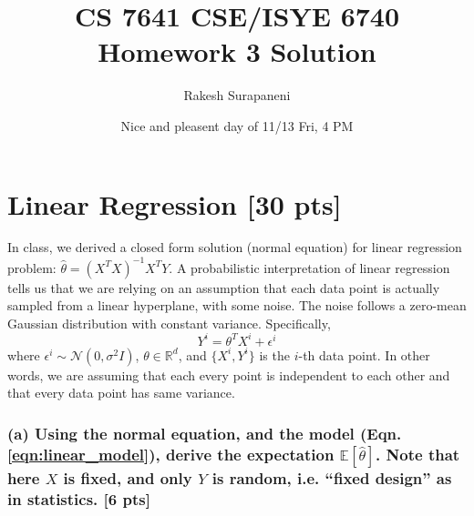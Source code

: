 \documentclass[twoside,10pt]{article}
\begin{document}
\title{CS 7641 CSE/ISYE 6740 Homework 3 Solution}
\author{Rakesh Surapaneni}
\date{ Nice and pleasent day of 11/13 Fri, 4 PM}
\maketitle

\section{Linear Regression [30 pts]}

In class, we derived a closed form solution (normal equation) for
linear regression problem: $\hat{\theta} = (X^T X)^{-1} X^T Y$. A
probabilistic interpretation of linear regression tells us that we
are relying on an assumption that each data point is actually
sampled from a linear hyperplane, with some noise. The noise
follows a zero-mean Gaussian distribution with constant variance.
Specifically,
\begin{equation}
Y^i = \theta^T X^i + \epsilon^i
\label{eqn:linear_model}
\end{equation}
where $\epsilon^i \sim \mathcal{N}(0, \sigma^2 I)$, $\theta \in \mathbb{R}^d$, and $\{X^i, Y^i\}$ is the $i$-th data point. In other words,
we are assuming that each every point is independent to each other
and that every data point has same variance.

\subsubsection*{(a) Using the normal equation, and the model (Eqn. \ref{eqn:linear_model}), derive the expectation
$\mathbb{E}[\hat{\theta}]$. Note that here $X$ is fixed, and only $Y$ is random, i.e. ``fixed design'' as in statistics. [6 pts]}
\end{document}
